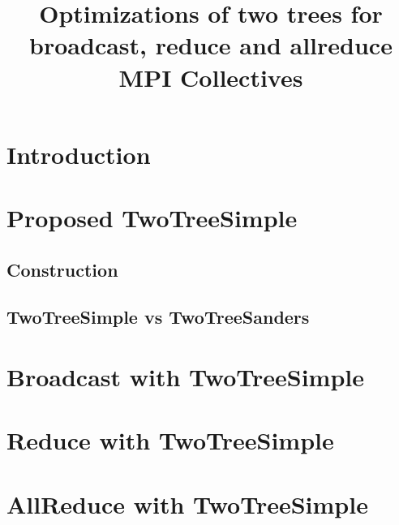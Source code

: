 \documentclass[sigconf]{acmart}
\renewcommand{\goal}[1]{}
\begin{document}
\title{Optimizations of two trees for broadcast, reduce and allreduce MPI Collectives}

%


\begin{abstract}

\end{abstract}

\maketitle

\section{Introduction}
\goal{Describe Collective communication and advantages of improving Two Tree algorithm}

\section{Proposed TwoTreeSimple}

\subsection{Construction}

\subsection{TwoTreeSimple vs TwoTreeSanders}

\section{Broadcast with TwoTreeSimple}

\section{Reduce with TwoTreeSimple}

\section{AllReduce with TwoTreeSimple}


 
\end{document}
